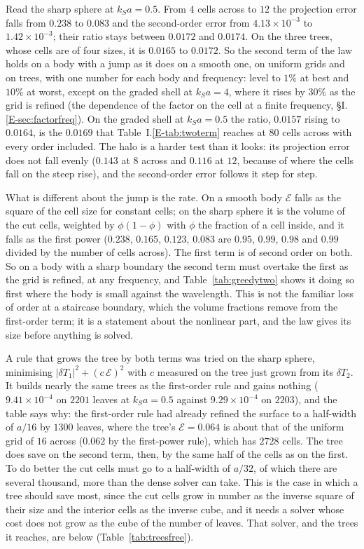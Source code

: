 \documentclass[11pt,a4paper]{article}
\newcommand{\cE}{\mathcal{E}}
\begin{document}
Read the sharp sphere at $k_Sa=0.5$. From $4$ cells across to $12$ the projection error falls from
$0.238$ to $0.083$ and the second-order error from $4.13\times10^{-3}$ to $1.42\times10^{-3}$; their ratio
stays between $0.0172$ and $0.0174$. On the three trees, whose cells are of four sizes, it is $0.0165$ to
$0.0172$. So the second term of the law holds on a body with a jump as it does on a smooth one, on
uniform grids and on trees, with one number for each body and frequency: level to $1\%$ at best and
$10\%$ at worst, except on the graded shell at $k_Sa=4$, where it rises by $30\%$ as the grid is refined
(the dependence of the factor on the cell at a finite frequency, \S I.\ref{E-sec:factorfreq}). On the graded
shell at $k_Sa=0.5$ the ratio, $0.0157$ rising to $0.0164$, is the $0.0169$ that Table~I.\ref{E-tab:twoterm}
reaches at $80$ cells across with every order included. The halo is a harder test than it looks: its
projection error does not fall evenly ($0.143$ at $8$ across and $0.116$ at $12$, because of where the
cells fall on the steep rise), and the second-order error follows it step for step.

What is different about the jump is the rate. On a smooth body $\cE$ falls as the square of the cell size
for constant cells; on the sharp sphere it is the volume of the cut cells, weighted by $\phi(1-\phi)$
with $\phi$ the fraction of a cell inside, and it falls as the first power ($0.238$, $0.165$, $0.123$,
$0.083$ are $0.95$, $0.99$, $0.98$ and $0.99$ divided by the number of cells across). The first term is of
second order on both. So on a body with a sharp boundary the second term must overtake the first as the
grid is refined, at any frequency, and Table~\ref{tab:greedytwo} shows it doing so first where the body
is small against the wavelength. This is not the familiar loss of order at a staircase boundary, which
the volume fractions remove from the first-order term; it is a statement about the nonlinear part, and
the law gives its size before anything is solved.

A rule that grows the tree by both terms was tried on the sharp sphere, minimising
$|\delta T_1|^2+(c\,\cE)^2$ with $c$ measured on the tree just grown from its $\delta T_2$. It builds
nearly the same trees as the first-order rule and gains nothing ($9.41\times10^{-4}$ on $2201$ leaves at
$k_Sa=0.5$ against $9.29\times10^{-4}$ on $2203$), and the table says why: the first-order rule had
already refined the surface to a half-width of $a/16$ by $1300$ leaves, where the tree's $\cE=0.064$ is
about that of the uniform grid of $16$ across ($0.062$ by the first-power rule), which has $2728$ cells. The tree does save on the second term, then, by the
same half of the cells as on the first. To do better the cut cells must go to a half-width of $a/32$, of which there are
several thousand, more than the dense solver can take. This is the case in which a tree should save most,
since the cut cells grow in number as the inverse square of their size and the interior cells as the
inverse cube, and it needs a solver whose cost does not grow as the cube of the number of leaves. That
solver, and the trees it reaches, are below (Table~\ref{tab:treesfree}).
\end{document}
